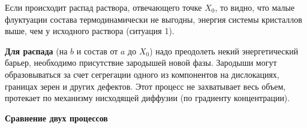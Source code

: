 Если происходит распад раствора, отвечающего точке $X_0$, то видно, что малые флуктуации состава термодинамически не выгодны, энергия системы кристаллов выше, чем у исходного раствора (ситуация 1). 


\textbf{Для распада} (на $b$ и состав от $a$ до $X_0$) надо преодолеть некий энергетический барьер, необходимо присутствие зародышей новой фазы. Зародыши могут образовываться за счет сегрегации одного из компонентов на дислокациях, границах зерен и других дефектов. Этот процесс не захватывает весь объем, протекает по механизму нисходящей диффузии (по градиенту концентрации).


\pagebreak
\textbf{Сравнение двух процессов}

\begin{table}[h!]
    \centering
\end{table}


